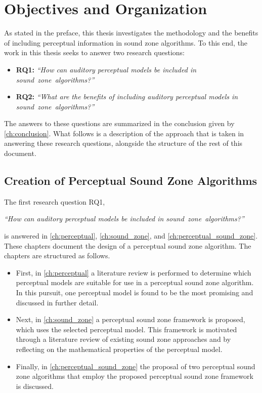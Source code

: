 \section{Objectives and Organization}
\label{ch:introduction:objectives}
As stated in the preface, this thesis investigates the methodology and the benefits of including perceptual information in sound zone algorithms.
To this end, the work in this thesis seeks to answer two research questions:
\begin{itemize}
    \item \textbf{RQ1:} {\textit{``How can auditory perceptual models be included in sound~zone~algorithms?''}}
    \item \textbf{RQ2:} {\textit{``What are the benefits of including auditory perceptual models in sound~zone~algorithms?''}}
\end{itemize}

The answers to these questions are summarized in the conclusion given by \autoref{ch:conclusion}. 
What follows is a description of the approach that is taken in answering these research questions, 
alongside the structure of the rest of this document.

\subsection{Creation of Perceptual Sound Zone Algorithms}
The first research question RQ1, 

\begin{center}
    {\textit{``How can auditory perceptual models be included in sound~zone~algorithms?''}}
\end{center}

is answered in \autoref{ch:perceptual}, \autoref{ch:sound_zone}, and \autoref{ch:perceptual_sound_zone}.
These chapters document the design of a perceptual sound zone algorithm.
The chapters are structured as follows.
\begin{itemize}
    \item First, in \autoref{ch:perceptual} a literature review is performed to determine which perceptual models are 
        suitable for use in a perceptual sound zone algorithm.
        In this pursuit, one perceptual model is found to be the most promising and discussed in further detail.
    \item Next, in \autoref{ch:sound_zone} a perceptual sound zone framework is proposed, which uses the selected perceptual model.
        This framework is motivated through a literature review of existing sound zone approaches 
        and by reflecting on the mathematical properties of the perceptual model.
    \item Finally, in \autoref{ch:perceptual_sound_zone} the proposal of two perceptual sound zone algorithms 
        that employ the proposed perceptual sound zone framework is discussed.
\end{itemize}

